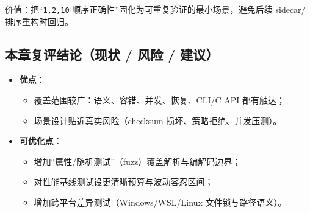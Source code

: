 价值：把“\texttt{1,2,10} 顺序正确性”固化为可重复验证的最小场景，避免后续 sidecar/排序重构时回归。

\subsection{本章复评结论（现状 / 风险 / 建议）}

\begin{itemize}
  \item \textbf{优点}：
    \begin{itemize}
      \item 覆盖范围较广：语义、容错、并发、恢复、CLI/C API 都有触达；
      \item 场景设计贴近真实风险（checksum 损坏、策略拒绝、并发压测）。
    \end{itemize}
  \item \textbf{可优化点}：
    \begin{itemize}
      \item 增加“属性/随机测试”（fuzz）覆盖解析与编解码边界；
      \item 对性能基线测试设更清晰预算与波动容忍区间；
      \item 增加跨平台差异测试（Windows/WSL/Linux 文件锁与路径语义）。
    \end{itemize}
\end{itemize}


